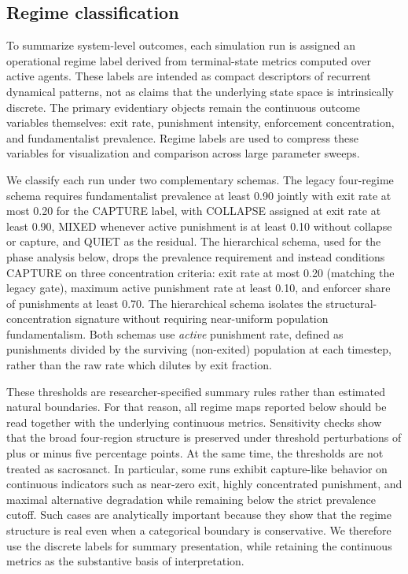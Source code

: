 \documentclass[12pt]{article}
\begin{document}
\subsection{Regime classification}

To summarize system-level outcomes, each simulation run is assigned an operational regime label derived from terminal-state metrics computed over active agents. These labels are intended as compact descriptors of recurrent dynamical patterns, not as claims that the underlying state space is intrinsically discrete. The primary evidentiary objects remain the continuous outcome variables themselves: exit rate, punishment intensity, enforcement concentration, and fundamentalist prevalence. Regime labels are used to compress these variables for visualization and comparison across large parameter sweeps.

We classify each run under two complementary schemas. The legacy four-regime schema requires fundamentalist prevalence at least 0.90 jointly with exit rate at most 0.20 for the CAPTURE label, with COLLAPSE assigned at exit rate at least 0.90, MIXED whenever active punishment is at least 0.10 without collapse or capture, and QUIET as the residual. The hierarchical schema, used for the phase analysis below, drops the prevalence requirement and instead conditions CAPTURE on three concentration criteria: exit rate at most 0.20 (matching the legacy gate), maximum active punishment rate at least 0.10, and enforcer share of punishments at least 0.70. The hierarchical schema isolates the structural-concentration signature without requiring near-uniform population fundamentalism. Both schemas use \emph{active} punishment rate, defined as punishments divided by the surviving (non-exited) population at each timestep, rather than the raw rate which dilutes by exit fraction.

These thresholds are researcher-specified summary rules rather than estimated natural boundaries. For that reason, all regime maps reported below should be read together with the underlying continuous metrics. Sensitivity checks show that the broad four-region structure is preserved under threshold perturbations of plus or minus five percentage points. At the same time, the thresholds are not treated as sacrosanct. In particular, some runs exhibit capture-like behavior on continuous indicators such as near-zero exit, highly concentrated punishment, and maximal alternative degradation while remaining below the strict prevalence cutoff. Such cases are analytically important because they show that the regime structure is real even when a categorical boundary is conservative. We therefore use the discrete labels for summary presentation, while retaining the continuous metrics as the substantive basis of interpretation.
\end{document}
